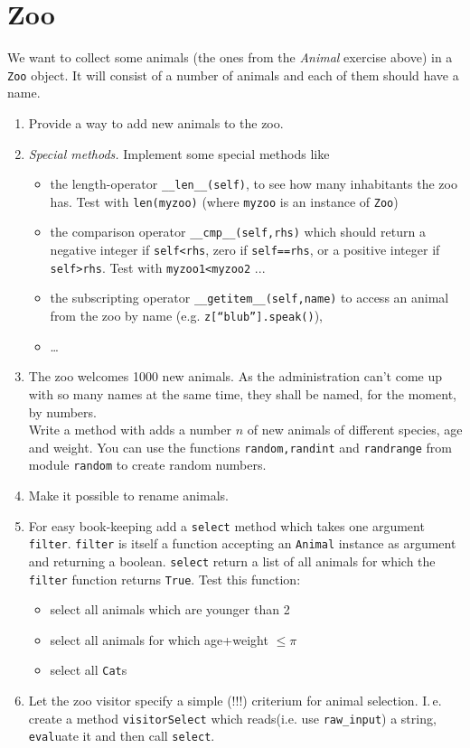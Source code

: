 \documentclass[12pt]{scrartcl}
\begin{document}
\section{Zoo}
We want to collect some animals (the ones from the \emph{Animal} exercise
above) in a \texttt{Zoo} object. It will consist of a
number of animals and each of them should have a name. 
\begin{enumerate}
\item Provide a way to add new animals to the zoo. 
\item \emph{Special methods.} Implement some special methods like
\begin{itemize}
\item the length-operator \texttt{\_\_len\_\_(self)}, to see how many inhabitants the zoo has. Test with \texttt{len(myzoo)} (where \texttt{myzoo} is an instance of \texttt{Zoo})
\item the comparison operator \texttt{\_\_cmp\_\_(self,rhs)} which should return a negative integer if \texttt{self<rhs}, zero if \texttt{self==rhs}, or a positive integer if \texttt{self>rhs}. Test with \texttt{myzoo1<myzoo2} ...
\item the subscripting operator \texttt{\_\_getitem\_\_(self,name)} to access an animal from the zoo by name (e.g. \texttt{z[``blub''].speak()}),
\item \dots
\end{itemize}

\item The zoo welcomes 1000 new animals. As the administration can't come up
  with so many names at the same time, they shall be named, for the moment, by
  numbers. \\
  Write a method with adds a number $n$ of new animals of different species, age
  and weight. You can use the functions  \texttt{random,randint} and
  \texttt{randrange} from module \texttt{random} to create random numbers.
\item Make it possible to rename animals.
\item For easy book-keeping add a \texttt{select} method which takes one
  argument \texttt{filter}. \texttt{filter} is itself a function accepting an
  \texttt{Animal} instance as argument and returning a
  boolean. \texttt{select} return a list of all animals for which the
  \texttt{filter} function returns \texttt{True}. Test this function:
  \begin{itemize}
  \item select all animals which are younger than 2
  \item select all animals for which age+weight $\leq \pi$
  \item select all \texttt{Cat}s
  \end{itemize}
\item Let the zoo visitor specify a simple (!!!) criterium for animal
  selection. I.\,e. create a method \texttt{visitorSelect} which
  reads(i.e. use \texttt{raw\_input}) a string, \texttt{eval}uate it and then call
  \texttt{select}. 

\end{enumerate}
\end{document}
